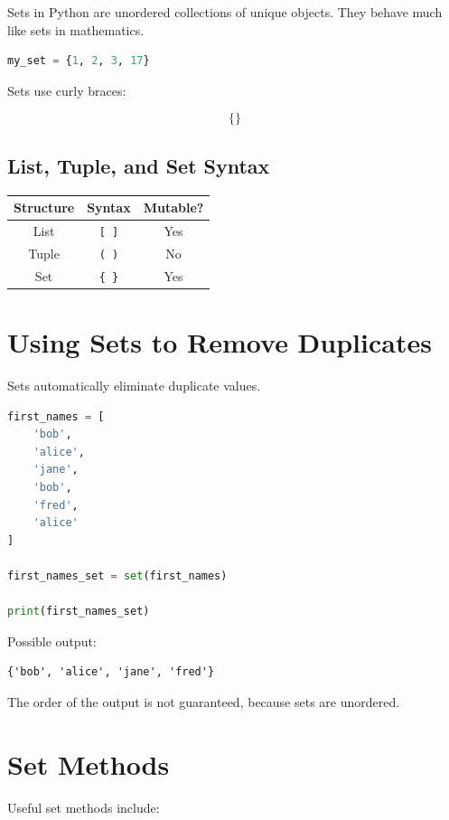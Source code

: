 \documentclass[11pt]{article}
\begin{document}
Sets in Python are unordered collections of unique objects. They behave much like sets in mathematics.

\begin{lstlisting}[language=Python]
my_set = {1, 2, 3, 17}
\end{lstlisting}

Sets use curly braces:

\[
\{ \}
\]

\subsection{List, Tuple, and Set Syntax}

\begin{center}
\begin{tabular}{|c|c|c|}
\hline
Structure & Syntax & Mutable? \\
\hline
List & \texttt{[ ]} & Yes \\
Tuple & \texttt{( )} & No \\
Set & \texttt{\{ \}} & Yes \\
\hline
\end{tabular}
\end{center}

\section{Using Sets to Remove Duplicates}

Sets automatically eliminate duplicate values.

\begin{lstlisting}[language=Python]
first_names = [
    'bob',
    'alice',
    'jane',
    'bob',
    'fred',
    'alice'
]

first_names_set = set(first_names)

print(first_names_set)
\end{lstlisting}

Possible output:

\begin{lstlisting}
{'bob', 'alice', 'jane', 'fred'}
\end{lstlisting}

The order of the output is not guaranteed, because sets are unordered.

\section{Set Methods}

Useful set methods include:
\end{document}

